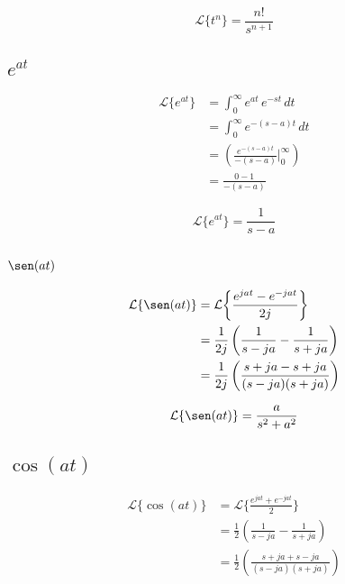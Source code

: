 \begin{equation}
    \mathcal{L}\{t^n\}=\frac{n!}{s^{n+1}}
\end{equation}

\subsection{$e^{at}$}
\begin{equation*}
\begin{split}
    \mathcal{L}\{e^{at}\}
        &=\int_0^{\infty}e^{at}\,e^{-st}\,dt\\
        &=\int_0^{\infty}e^{-(s-a)t}\,dt\\
        &=\left(\frac{e^{-(s-a)t}}{-(s-a)}\Biggr|_0^{\infty}\right)\\
        &=\frac{0-1}{-(s-a)}
\end{split}
\end{equation*}

\begin{equation}
    \mathcal{L}\{e^{at}\}=\frac{1}{s-a}
\end{equation}

\subsection{$\sen(at)$}
\begin{equation*}
\begin{split}
    \mathcal{L}\{\sen(at)\}
        &=\mathcal{L}\biggl\{\frac{e^{jat}-e^{-jat}}{2j}\biggl\}\\
        &=\frac{1}{2j}\left(\frac{1}{s-ja}-\frac{1}{s+ja}\right)\\
        &=\frac{1}{2j}\left(\frac{s+ja-s+ja}{(s-ja)(s+ja)}\right)
\end{split}
\end{equation*}

\begin{equation}
    \mathcal{L}\{\sen(at)\}=\frac{a}{s^2+a^2}
\end{equation}

\subsection{$\cos(at)$}
\begin{equation*}
\begin{split}
    \mathcal{L}\{\cos(at)\}
        &=\mathcal{L}\biggl\{\frac{e^{jat}+e^{-jat}}{2}\biggl\}\\
        &=\frac{1}{2}\left(\frac{1}{s-ja}-\frac{1}{s+ja}\right)\\
        &=\frac{1}{2}\left(\frac{s+ja+s-ja}{(s-ja)(s+ja)}\right)
\end{split}
\end{equation*}

